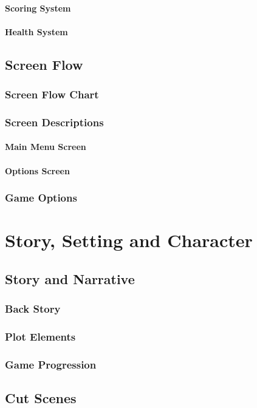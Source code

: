 \documentclass[14pts]{report}
\begin{document}
\subsubsection{Scoring System}
\subsubsection{Health System}
\section{Screen Flow}
\subsection{Screen Flow Chart}
\subsection{Screen Descriptions}
\subsubsection{Main Menu Screen}
\subsubsection{Options Screen}
\subsection{Game Options}

\chapter{Story, Setting and Character}
\section{Story and Narrative}
\subsection{Back Story}
\subsection{Plot Elements}
\subsection{Game Progression}

\section{Cut Scenes}
\end{document}
